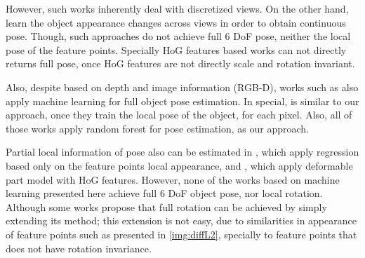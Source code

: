 \documentclass[annual]{acmsiggraph}
\begin{document}
However, such works inherently deal with discretized views. On the other hand, \cite{Torki:2011,He:2014,Hara:2014,Shimizu:2014,Zhen:2015} learn the object appearance changes across views in order to obtain continuous pose. Though, such approaches do not achieve full 6 DoF pose, neither the local pose of the feature points. Specially HoG features based works can not directly returns full pose, once HoG features are not directly scale and rotation invariant.            
	
Also, despite based on depth and image information (RGB-D), works such as \cite{Shotton:2013,Brachmann:2014,Tejani:2014} also apply machine learning for full object pose estimation. In special, \cite{Tejani:2014} is similar to our approach, once they train the local pose of the object, for each pixel. Also, all of those works apply random forest for pose estimation, as our approach.  

Partial local information of pose also can be estimated in \cite{Fenzi:2013}, which apply regression based only on the feature points local appearance, and \cite{Pepik:2012}, which apply deformable part model with HoG features. However, none of the works based on machine learning presented here achieve full 6 DoF object pose, nor local rotation. Although some works propose that full rotation can be achieved by simply extending its method; this extension is not easy, due to similarities in appearance of feature points such as presented in \ref{img:diffL2}, specially to feature points that does not have rotation invariance. 
\end{document}
